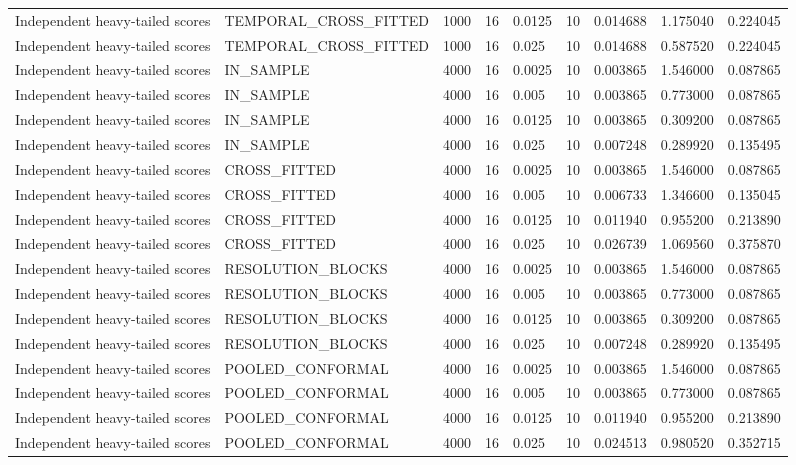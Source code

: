 \begin{tabular}{lllllllll}
Independent heavy-tailed scores & TEMPORAL\_CROSS\_FITTED & 1000 & 16 & 0.0125 & 10 & 0.014688 & 1.175040 & 0.224045 \\
Independent heavy-tailed scores & TEMPORAL\_CROSS\_FITTED & 1000 & 16 & 0.025 & 10 & 0.014688 & 0.587520 & 0.224045 \\
Independent heavy-tailed scores & IN\_SAMPLE & 4000 & 16 & 0.0025 & 10 & 0.003865 & 1.546000 & 0.087865 \\
Independent heavy-tailed scores & IN\_SAMPLE & 4000 & 16 & 0.005 & 10 & 0.003865 & 0.773000 & 0.087865 \\
Independent heavy-tailed scores & IN\_SAMPLE & 4000 & 16 & 0.0125 & 10 & 0.003865 & 0.309200 & 0.087865 \\
Independent heavy-tailed scores & IN\_SAMPLE & 4000 & 16 & 0.025 & 10 & 0.007248 & 0.289920 & 0.135495 \\
Independent heavy-tailed scores & CROSS\_FITTED & 4000 & 16 & 0.0025 & 10 & 0.003865 & 1.546000 & 0.087865 \\
Independent heavy-tailed scores & CROSS\_FITTED & 4000 & 16 & 0.005 & 10 & 0.006733 & 1.346600 & 0.135045 \\
Independent heavy-tailed scores & CROSS\_FITTED & 4000 & 16 & 0.0125 & 10 & 0.011940 & 0.955200 & 0.213890 \\
Independent heavy-tailed scores & CROSS\_FITTED & 4000 & 16 & 0.025 & 10 & 0.026739 & 1.069560 & 0.375870 \\
Independent heavy-tailed scores & RESOLUTION\_BLOCKS & 4000 & 16 & 0.0025 & 10 & 0.003865 & 1.546000 & 0.087865 \\
Independent heavy-tailed scores & RESOLUTION\_BLOCKS & 4000 & 16 & 0.005 & 10 & 0.003865 & 0.773000 & 0.087865 \\
Independent heavy-tailed scores & RESOLUTION\_BLOCKS & 4000 & 16 & 0.0125 & 10 & 0.003865 & 0.309200 & 0.087865 \\
Independent heavy-tailed scores & RESOLUTION\_BLOCKS & 4000 & 16 & 0.025 & 10 & 0.007248 & 0.289920 & 0.135495 \\
Independent heavy-tailed scores & POOLED\_CONFORMAL & 4000 & 16 & 0.0025 & 10 & 0.003865 & 1.546000 & 0.087865 \\
Independent heavy-tailed scores & POOLED\_CONFORMAL & 4000 & 16 & 0.005 & 10 & 0.003865 & 0.773000 & 0.087865 \\
Independent heavy-tailed scores & POOLED\_CONFORMAL & 4000 & 16 & 0.0125 & 10 & 0.011940 & 0.955200 & 0.213890 \\
Independent heavy-tailed scores & POOLED\_CONFORMAL & 4000 & 16 & 0.025 & 10 & 0.024513 & 0.980520 & 0.352715 \\

\end{tabular}
